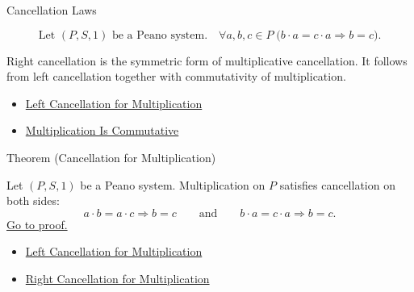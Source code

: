 \begin{topicbox}{Cancellation Laws}
\begin{remark*}
\[
\text{Let } (P,S,1) \text{ be a Peano system.}\quad
\forall a,b,c \in P\;\bigl(b\cdot a=c\cdot a \Longrightarrow b=c\bigr).
\]
\end{remark*}

\begin{remark*}[Interpretation]
Right cancellation is the symmetric form of multiplicative cancellation. It
follows from left cancellation together with commutativity of multiplication.
\end{remark*}

\begin{dependencies}
\begin{itemize}
  \item \hyperref[thm:multiplication-left-cancellation]{Left Cancellation for Multiplication}
  \item \hyperref[thm:multiplication-commutative]{Multiplication Is Commutative}
\end{itemize}
\end{dependencies}

\begin{theorembox}{Theorem (Cancellation for Multiplication)}
\begin{theorem}
\label{thm:multiplication-cancellation}
Let $(P,S,1)$ be a Peano system. Multiplication on $P$ satisfies cancellation
on both sides:
\[
a\cdot b=a\cdot c\Longrightarrow b=c
\qquad\text{and}\qquad
b\cdot a=c\cdot a\Longrightarrow b=c.
\]
\hyperref[prf:multiplication-cancellation]{Go to proof.}
\end{theorem}
\end{theorembox}

\begin{dependencies}
\begin{itemize}
  \item \hyperref[thm:multiplication-left-cancellation]{Left Cancellation for Multiplication}
  \item \hyperref[thm:multiplication-right-cancellation]{Right Cancellation for Multiplication}
\end{itemize}
\end{dependencies}
\end{topicbox}
